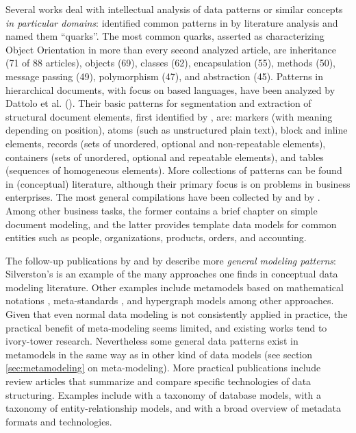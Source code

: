 Several works deal with intellectual analysis of data patterns or similar
concepts \emph{in particular domains}: \textcite{Armstrong2006} identified
common patterns in   by literature analysis and named
them ``quarks''.  The most common quarks, asserted as characterizing Object
Orientation in more than every second analyzed article, are inheritance (71 of
88 articles), objects (69), classes (62), encapsulation (55), methods (50),
message passing (49), polymorphism (47), and abstraction (45). Patterns in
hierarchical documents, with focus on  based languages, have been
analyzed by Dattolo et al. (\citeyear{Dattolo2007a}). Their basic patterns for
segmentation and extraction of structural document elements, first identified
by \textcite{Vitali2005}, are: markers (with meaning depending on position),
atoms (such as unstructured plain text), block and inline elements, records
(sets of unordered, optional and non-repeatable elements), containers (sets of
unordered, optional and repeatable elements), and tables (sequences of
homogeneous elements).  More collections of patterns can be found in
(conceptual)  literature, although their primary focus is
on problems in business enterprises. The most general compilations have been
collected by \textcite{Hay1995} and by \textcite{Silverston2001}. Among other
business tasks, the former contains a brief chapter on simple document
modeling, and the latter provides template data models for common entities such
as people, organizations, products, orders, and accounting.
 
The follow-up publications by \textcite{Hay2006} and by
\textcite{Silverston2009} describe more \emph{general modeling patterns}:
Silverston's   is an example of the many
 approaches one finds in conceptual data modeling
literature.  Other examples include metamodels based on mathematical notations
\cite{Keet2008a}, meta-standards \cite{OMG2009}, and hypergraph models
\cite{Boyd2005} among other approaches. Given that even normal data modeling is
not consistently applied in practice, the practical benefit of meta-modeling
seems limited, and existing works tend to ivory-tower research. Nevertheless
some general data patterns exist in metamodels in the same way as in other kind
of data models (see section \ref{sec:metamodeling} on meta-modeling). More
practical publications include review articles that summarize and compare
specific technologies of data structuring. Examples include
\textcite{Kerschberg1976} with a taxonomy of database models,
\textcite{Kent1983b} with a taxonomy of entity-relationship models, and
\textcite{Riley2010} with a broad overview of metadata formats and
technologies.

